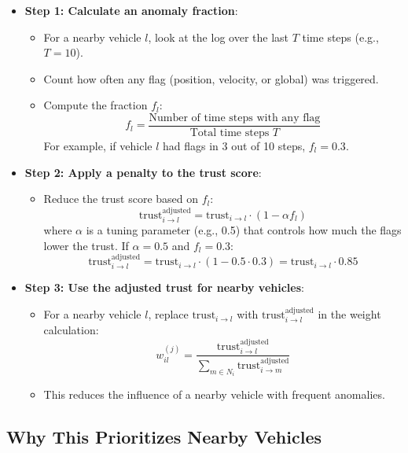 \documentclass{article}
\begin{document}
\begin{itemize}
    \item \textbf{Step 1: Calculate an anomaly fraction}:
    \begin{itemize}
        \item For a nearby vehicle \( l \), look at the log over the last \( T \) time steps (e.g., \( T = 10 \)).
        \item Count how often any flag (position, velocity, or global) was triggered.
        \item Compute the fraction \( f_l \):
        \[
        f_l = \frac{\text{Number of time steps with any flag}}{\text{Total time steps } T}
        \]
        For example, if vehicle \( l \) had flags in 3 out of 10 steps, \( f_l = 0.3 \).
    \end{itemize}
    
    \item \textbf{Step 2: Apply a penalty to the trust score}:
    \begin{itemize}
        \item Reduce the trust score based on \( f_l \):
        \[
        \text{trust}_{i \to l}^{\text{adjusted}} = \text{trust}_{i \to l} \cdot (1 - \alpha f_l)
        \]
        where \( \alpha \) is a tuning parameter (e.g., 0.5) that controls how much the flags lower the trust. If \( \alpha = 0.5 \) and \( f_l = 0.3 \):
        \[
        \text{trust}_{i \to l}^{\text{adjusted}} = \text{trust}_{i \to l} \cdot (1 - 0.5 \cdot 0.3) = \text{trust}_{i \to l} \cdot 0.85
        \]
    \end{itemize}
    
    \item \textbf{Step 3: Use the adjusted trust for nearby vehicles}:
    \begin{itemize}
        \item For a nearby vehicle \( l \), replace \( \text{trust}_{i \to l} \) with \( \text{trust}_{i \to l}^{\text{adjusted}} \) in the weight calculation:
        \[
        w_{il}^{(j)} = \frac{\text{trust}_{i \to l}^{\text{adjusted}}}{\sum_{m \in N_i} \text{trust}_{i \to m}^{\text{adjusted}}}
        \]
        \item This reduces the influence of a nearby vehicle with frequent anomalies.
    \end{itemize}
\end{itemize}

\subsection{Why This Prioritizes Nearby Vehicles}
\end{document}
